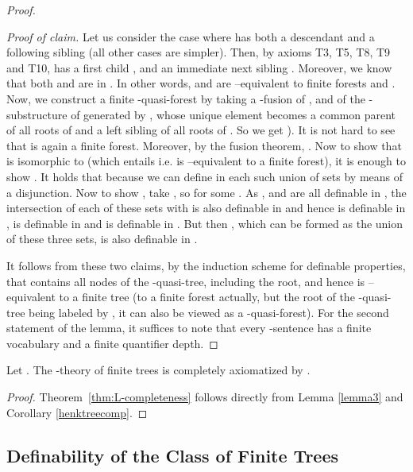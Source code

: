 \documentclass{LMCS}
\newenvironment{proofofclaim}{\begin{trivlist}\item\textit{Proof of claim.}}{\hfill\end{trivlist}}
\begin{document}
\begin{proof}
  \begin{proofofclaim}
    Let us consider the case where  has both a
    descendant and a following sibling (all other cases are
    simpler). Then, by axioms T3, T5, T8, T9 and T10,  has a first child , and
    an immediate next sibling . Moreover, we know that both  and
     are in . In other words,  and  are
    --equivalent to finite forests  and . Now, we
    construct a finite -quasi-forest  by taking a -fusion of ,  and of the -substructure of  generated by , whose unique element becomes a
    common parent of all roots of  and a left sibling of all
    roots of . So we get ).
    It is not hard to see that  is again a finite
    forest. Moreover, by the fusion theorem,
    .
    Now to show that  is isomorphic to  (which entails  i.e.  is --equivalent to a finite forest),
    it is enough to show . It holds that  because we can define in  each such union of sets by means
    of a disjunction. Now to show , take , so  for some . As ,
     and  are all definable in , the intersection of each of these sets with  is also definable in  and hence 
     is definable in ,  is definable in  and 
     is definable in . But then , which can be formed as the union of these three sets, is also definable in .
    
    \end{proofofclaim}

  It follows from these two claims, by the induction scheme for
  definable properties, that  contains all nodes of the -quasi-tree,
  including the root, and hence  is --equivalent to a finite
  tree (to a finite forest actually, but the root of the -quasi-tree being labeled by , it can also be viewed as a  -quasi-forest).
  For the second statement of the lemma, it suffices to
  note that every -sentence has a finite vocabulary and a finite
  quantifier depth.
\end{proof}

\begin{thm}\label{thm:L-completeness}
  Let . The -theory of finite trees is completely axiomatized by .
\end{thm}

\begin{proof}
Theorem~\ref{thm:L-completeness} follows directly from Lemma \ref{lemma3} and Corollary \ref{henktreecomp}.
\end{proof}

\subsection{Definability of the Class of Finite Trees}
\label{sec53}
\end{document}
